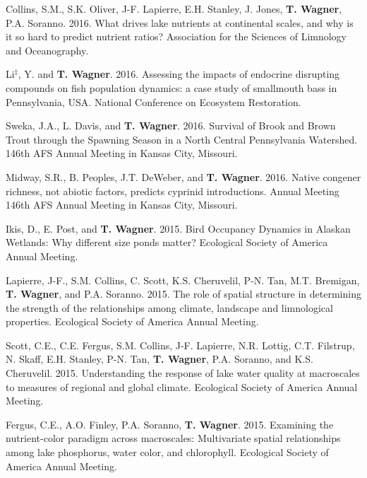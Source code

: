 \documentclass[10pt]{article}
\begin{document}
\begin{flushleft}
\begin{etaremune}
\item Collins, S.M., S.K. Oliver, J-F. Lapierre, E.H. Stanley, J. Jones,  {\bf T. Wagner}, P.A. Soranno. 2016. What drives lake nutrients at continental scales, and why is it so hard to predict nutrient ratios? Association for the Sciences of Limnology and Oceanography. 

\item Li$^\ddagger$, Y. and  {\bf T. Wagner}. 2016. Assessing the impacts of endocrine disrupting compounds on fish population dynamics: a case study of smallmouth bass in Pennsylvania, USA. National Conference on Ecosystem Restoration. 

\item Sweka, J.A., L. Davis, and {\bf T. Wagner}. 2016. Survival of Brook and Brown Trout through the Spawning Season in a North Central Pennsylvania Watershed. 146th AFS Annual Meeting in Kansas City, Missouri.

\item Midway, S.R., B. Peoples, J.T. DeWeber, and {\bf T. Wagner}. 2016. Native congener richness, not abiotic factors, predicts cyprinid introductions. Annual Meeting 146th AFS Annual Meeting in Kansas City, Missouri. 


\item Ikis, D., E. Post, and {\bf T. Wagner}. 2015. Bird Occupancy Dynamics in Alaskan Wetlands: Why different size ponds matter?  Ecological Society of America Annual Meeting. 

\item Lapierre, J-F., S.M. Collins, C. Scott, K.S. Cheruvelil, P-N. Tan, M.T. Bremigan, {\bf T. Wagner}, and P.A. Soranno. 2015. The role of spatial structure in determining the strength of the relationships among climate, landscape and limnological properties. Ecological Society of America Annual Meeting.\\

\item Scott, C.E., C.E. Fergus, S.M. Collins, J-F. Lapierre, N.R. Lottig, C.T. Filstrup, N. Skaff, E.H. Stanley, P-N. Tan, {\bf T. Wagner}, P.A. Soranno, and K.S. Cheruvelil. 2015. Understanding the response of lake water quality at macroscales to measures of regional and global climate. Ecological Society of America Annual Meeting.

\item Fergus, C.E., A.O. Finley, P.A. Soranno, {\bf T. Wagner}. 2015. Examining the nutrient-color paradigm across macroscales: Multivariate spatial relationships among lake phosphorus, water color, and chlorophyll.  Ecological Society of America Annual Meeting.


\end{etaremune}
\end{flushleft}
\end{document}
